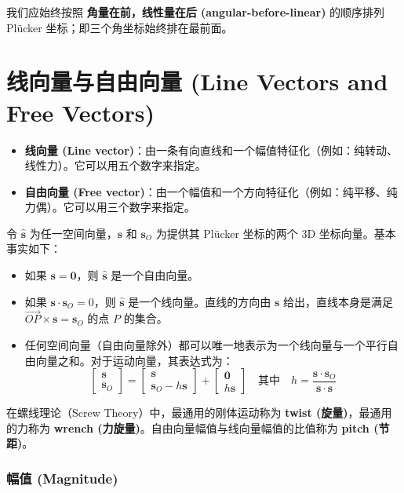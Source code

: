 我们应始终按照 \textbf{角量在前，线性量在后 (angular-before-linear)} 的顺序排列 Plücker 坐标；即三个角坐标始终排在最前面。

\section*{线向量与自由向量 (Line Vectors and Free Vectors)}

\begin{itemize}
    \item \textbf{线向量 (Line vector)}：由一条有向直线和一个幅值特征化（例如：纯转动、线性力）。它可以用五个数字来指定。
    \item \textbf{自由向量 (Free vector)}：由一个幅值和一个方向特征化（例如：纯平移、纯力偶）。它可以用三个数字来指定。
\end{itemize}

令 $\hat{\bm{s}}$ 为任一空间向量，$\bm{s}$ 和 $\bm{s}_O$ 为提供其 Plücker 坐标的两个 3D 坐标向量。基本事实如下：
\begin{itemize}
    \item 如果 $\bm{s} = \bm{0}$，则 $\hat{\bm{s}}$ 是一个自由向量。
    \item 如果 $\bm{s} \cdot \bm{s}_O = 0$，则 $\hat{\bm{s}}$ 是一个线向量。直线的方向由 $\bm{s}$ 给出，直线本身是满足 $\vec{OP} \times \bm{s} = \bm{s}_O$ 的点 $P$ 的集合。
    \item 任何空间向量（自由向量除外）都可以唯一地表示为一个线向量与一个平行自由向量之和。对于运动向量，其表达式为：
    \begin{equation}
    \begin{bmatrix} \bm{s} \\ \bm{s}_O \end{bmatrix} = \begin{bmatrix} \bm{s} \\ \bm{s}_O - h\bm{s} \end{bmatrix} + \begin{bmatrix} \bm{0} \\ h\bm{s} \end{bmatrix} \quad \text{其中} \quad h = \frac{\bm{s} \cdot \bm{s}_O}{\bm{s} \cdot \bm{s}}
    \end{equation}
\end{itemize}

在螺线理论（Screw Theory）中，最通用的刚体运动称为 \textbf{twist (旋量)}，最通用的力称为 \textbf{wrench (力旋量)}。自由向量幅值与线向量幅值的比值称为 \textbf{pitch (节距)}。

\subsubsection*{幅值 (Magnitude)}

